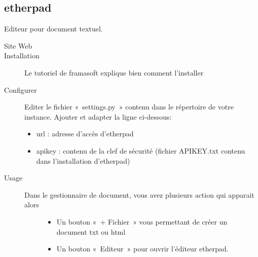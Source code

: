 \documentclass[a4paper,10pt,oneside,french]{sphinxmanual}
\begin{document}
\subsection{etherpad}
\label{\detokenize{documents/editor:etherpad}}
Editeur pour document textuel.
\begin{description}
\item[{Site Web}] \leavevmode
{}

\item[{Installation}] \leavevmode
Le tutoriel de framasoft explique bien comment l’installer

\item[{Configurer}] \leavevmode
Editer le fichier « settings.py » contenu dans le répertoire de votre instance.
Ajouter et adapter la ligne ci-dessous:
\begin{itemize}
\item {} 
url : adresse d’accès d’etherpad

\item {} 
apikey : contenu de la clef de sécurité (fichier APIKEY.txt contenu dans l’installation d’etherpad)

\end{itemize}

\end{description}

\begin{sphinxVerbatim}[commandchars=\\\{\}]
     
\end{sphinxVerbatim}
\begin{description}
\item[{Usage}] \leavevmode\begin{description}
\item[{Dans le gestionnaire de document, vous avez plusieurs action qui apparait alors}] \leavevmode\begin{itemize}
\item {} 
Un bouton « + Fichier » vous permettant de créer un document txt ou html

\item {} 
Un bouton « Editeur » pour ouvrir l’éditeur etherpad.

\end{itemize}

\end{description}

\end{description}
\end{document}
